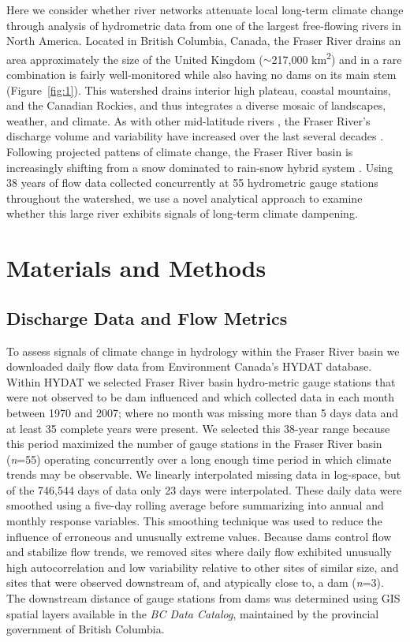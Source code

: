 \documentclass[draft,linenumbers]{AGUJournal}
\begin{document}
Here we consider whether river networks attenuate local long-term climate change through analysis of hydrometric data from one of the largest free-flowing rivers in North America. Located in British Columbia, Canada, the Fraser River drains an area approximately the size of the United Kingdom ($\sim$217,000 km\textsuperscript{2}) and in a rare combination is fairly well-monitored while also having no dams on its main stem \citep{Vorosmarty:2010} (Figure~\ref{fig:1}). This watershed drains interior high plateau, coastal mountains, and the Canadian Rockies, and thus integrates a diverse mosaic of landscapes, weather, and climate. As with other mid-latitude rivers \citep{Bindoff:2013}, the Fraser River's discharge volume and variability have increased over the last several decades \citep{Dery:2012,Morrison:2002}. Following projected pattens of climate change, the Fraser River basin is increasingly shifting from a snow dominated to rain-snow hybrid system \citep{Kang:2016}. Using 38 years of flow data collected concurrently at 55 hydrometric gauge stations throughout the watershed, we use a novel analytical approach to examine whether this large river exhibits signals of long-term climate dampening.

\section{Materials and Methods}

\subsection{Discharge Data and Flow Metrics}

	To assess signals of climate change in hydrology within the Fraser River basin we downloaded daily flow data from Environment Canada's HYDAT database. Within HYDAT we selected Fraser River basin hydro-metric gauge stations that were not observed to be dam influenced and which collected data in each month between 1970 and 2007; where no month was missing more than 5 days data and at least 35 complete years were present. We selected this 38-year range because this period maximized the number of gauge stations in the Fraser River basin (\textit{n}=55) operating concurrently over a long enough time period in which climate trends may be observable. We linearly interpolated missing data in log-space, but of the 746,544 days of data only 23 days were interpolated. These daily data were smoothed using a five-day rolling average before summarizing into annual and monthly response variables. This smoothing technique was used to reduce the influence of erroneous and unusually extreme values. Because dams control flow and stabilize flow trends, we removed sites where daily flow exhibited unusually high autocorrelation and low variability relative to other sites of similar size, and sites that were observed downstream of, and atypically close to, a dam (\textit{n}=3). The downstream distance of gauge stations from dams was determined using GIS spatial layers available in the \textit{BC Data Catalog}, maintained by the provincial government of British Columbia.
\end{document}
